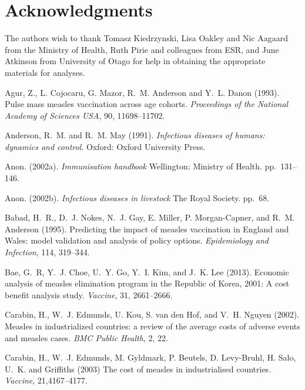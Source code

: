 \documentclass{article}
\begin{document}
\section{Acknowledgments}
The authors wish to thank Tomasz Kiedrzynski, Lisa Oakley and Nic Aagaard from the Ministry of Health, Ruth Pirie and colleagues from ESR, and June Atkinson from University of Otago for help in obtaining the appropriate materials for analyses.

\begin{thebibliography}{}


Agur, Z., L. Cojocaru, G. Mazor, R.~M. Anderson and Y.~L. Danon (1993).
\newblock Pulse mass measles vaccination across age cohorts.
\newblock \emph{Proceedings of the National Academy of Sciences USA}, 90, 11698--11702.

Anderson, R.~M. and R.~M. May (1991).
\newblock \emph{Infectious diseases of humans: dynamics and control}. Oxford: Oxford University Press.

Anon. (2002a).
\newblock \emph{Immunisation handbook}
\newblock Wellington: Ministry of Health. pp.~131--146.

Anon. (2002b).
\newblock \emph{Infectious diseases in livestock}
\newblock The Royal Society. pp.~68.

Babad, H.~R., D.~J. Nokes, N.~J. Gay, E. Miller, P. Morgan-Capner, and R.~M. Anderson (1995).
\newblock Predicting the impact of measles vaccination in England and Wales: model validation and analysis of policy options.
\newblock \emph{Epidemiology and Infection}, 114, 319--344.

Bae, G.~R, Y.~J. Choe, U.~Y. Go, Y.~I. Kim, and J.~K. Lee (2013). 
\newblock Economic analysis of measles elimination program in the Republic of Korea, 2001: A cost benefit analysis study.
\newblock \emph {Vaccine}, 31, 2661--2666.

Carabin, H., W.~J. Edmunds, U. Kou, S. van den Hof, and V.~H. Nguyen (2002). 
\newblock Measles in industrialized countries: a review of the average costs of adverse events and measles cases.
\newblock \emph{BMC Public Health}, 2, 22.

Carabin, H., W.~J. Edmunds, M. Gyldmark, P. Beutels, D. Levy-Bruhl, H. Salo, U.~K. and Griffiths (2003)
\newblock The cost of measles in industrialised countries.
\newblock \emph{Vaccine}, 21,4167--4177.


\end{thebibliography}
\end{document}
